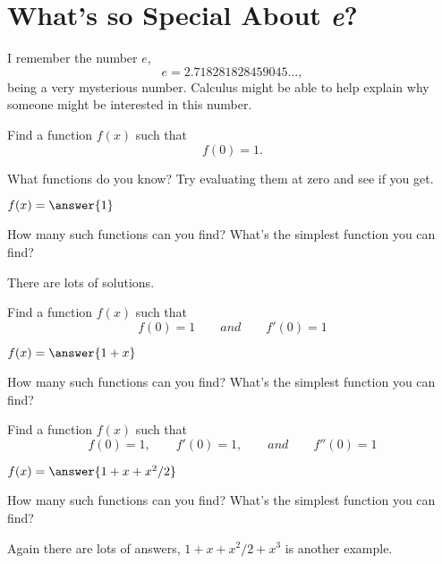 \documentclass{ximera}
\begin{document}
\section{What's so Special About \textit{e}?}

I remember the number $e$,
\[
e = 2.718281828459045\dots,
\]
being a very mysterious number. Calculus might be able to help explain
why someone might be interested in this number.

\begin{question}
  Find a function $f(x)$ such that
  \[
  f(0) = 1.
  \]
  \begin{solution}
    \begin{hint}
      What functions do you know? Try evaluating them at zero and see
      if you get.
    \end{hint}
    $f(x) = \answer{1}$
  \end{solution}
  How many such functions can you find? What's the simplest function you
  can find?
  \begin{solution}
    \begin{hint}
      There are lots of solutions.
    \end{hint}
  \end{solution}
\end{question}


\begin{question}
  Find a function $f(x)$ such that
  \[
  f(0) = 1\qquad and \qquad f'(0) = 1
  \]
  \begin{solution}
    $f(x) = \answer{1+x}$
  \end{solution}
  How many such functions can you find? What's the simplest function you
  can find?
  \begin{solution}
  \end{solution}
\end{question}

\begin{question}
Find a function $f(x)$ such that
\[
f(0) = 1,\qquad f'(0) = 1,\qquad and \qquad f''(0) = 1
\]
  \begin{solution}
    $f(x) = \answer{1+x+x^2/2}$
  \end{solution}
  How many such functions can you find? What's the simplest function you
  can find?
  \begin{solution}{Again there are lots of answers, $1+x+x^2/2 + x^3$
      is another example.}
  \end{solution}
\end{question}
\end{document}
